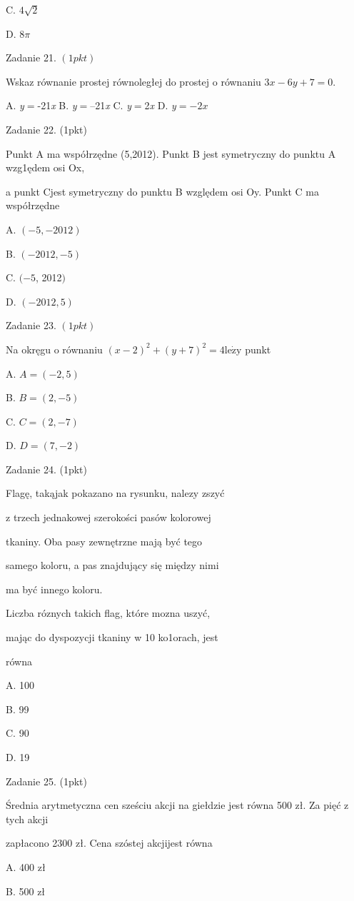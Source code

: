 \documentclass[a4paper,12pt]{article}
\begin{document}
C. $4\sqrt{2}$

D. $ 8\pi$

Zadanie 21. $(1pkt)$

Wskaz równanie prostej równoległej do prostej o równaniu $3x-6y+7=0.$

A. {\it y}$=$-21{\it x} B. {\it y}$=$--21{\it x} C. {\it y}$=$2{\it x} D. {\it y}$=- 2x$

Zadanie 22. (1pkt)

Punkt A ma współrzędne (5,2012). Punkt B jest symetryczny do punktu A wzg1ędem osi Ox,

a punkt Cjest symetryczny do punktu B względem osi Oy. Punkt C ma współrzędne

A. $(-5,-2012)$

B. $(-2012,-5)$

C. $(-5$, 2012$)$

D. $(-2012,5)$

Zadanie 23. $(1pkt)$

Na okręgu o równaniu $(x-2)^{2}+(y+7)^{2}=4\mathrm{l}\mathrm{e}\dot{\mathrm{z}}\mathrm{y}$ punkt

A. $A=(-2,5)$

B. $B=(2,-5)$

C. $C=(2,-7)$

D. $D=(7,-2)$

Zadanie 24. (1pkt)

Flagę, takąjak pokazano na rysunku, nalezy zszyć

z trzech jednakowej szerokości pasów kolorowej

tkaniny. Oba pasy zewnętrzne mają być tego

samego koloru, a pas znajdujący się między nimi

ma być innego koloru.

Liczba róznych takich flag, które mozna uszyć,

mając do dyspozycji tkaniny w 10 ko1orach, jest

równa

A. 100

B. 99

C. 90

D. 19

Zadanie 25. (1pkt)

Średnia arytmetyczna cen sześciu akcji na giełdzie jest równa 500 zł. Za pięć z tych akcji

zapłacono 2300 zł. Cena szóstej akcjijest równa

A. 400 zł

B. 500 zł
\end{document}
